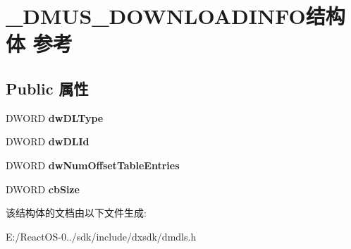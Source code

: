 \hypertarget{struct___d_m_u_s___d_o_w_n_l_o_a_d_i_n_f_o}{}\section{\+\_\+\+D\+M\+U\+S\+\_\+\+D\+O\+W\+N\+L\+O\+A\+D\+I\+N\+F\+O结构体 参考}
\label{struct___d_m_u_s___d_o_w_n_l_o_a_d_i_n_f_o}
\subsection*{Public 属性}
\begin{DoxyCompactItemize}
\item 
\mbox{\label{struct___d_m_u_s___d_o_w_n_l_o_a_d_i_n_f_o_ac28d0d8b150f6c04b405912c06a518c9}} 
D\+W\+O\+RD {\bfseries dw\+D\+L\+Type}
\item 
\mbox{\label{struct___d_m_u_s___d_o_w_n_l_o_a_d_i_n_f_o_a2b4931cb0730b1dbb8e2ad9c156cc74b}} 
D\+W\+O\+RD {\bfseries dw\+D\+L\+Id}
\item 
\mbox{\label{struct___d_m_u_s___d_o_w_n_l_o_a_d_i_n_f_o_ab5b9fc30dc115607cb74261d9d22e003}} 
D\+W\+O\+RD {\bfseries dw\+Num\+Offset\+Table\+Entries}
\item 
\mbox{\label{struct___d_m_u_s___d_o_w_n_l_o_a_d_i_n_f_o_ae63efb4e4ab0a3873d5cc57940e104c8}} 
D\+W\+O\+RD {\bfseries cb\+Size}
\end{DoxyCompactItemize}


该结构体的文档由以下文件生成\+:\begin{DoxyCompactItemize}
\item 
E\+:/\+React\+O\+S-\/0../sdk/include/dxsdk/dmdls.\+h\end{DoxyCompactItemize}
